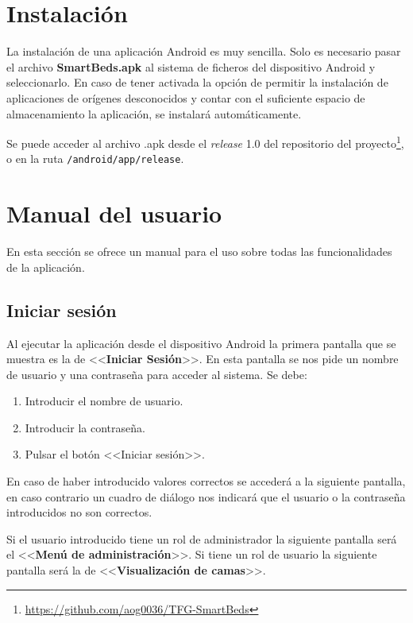 \section{Instalación}

La instalación de una aplicación Android es muy sencilla. Solo es necesario pasar el archivo \textbf{SmartBeds.apk} al sistema de ficheros del dispositivo Android y seleccionarlo. En caso de tener activada la opción de permitir la instalación de aplicaciones de orígenes desconocidos y contar con el suficiente espacio de almacenamiento la aplicación, se instalará automáticamente. 

Se puede acceder al archivo .apk desde el \textit{release} 1.0 del repositorio del proyecto\footnote{\url{https://github.com/aog0036/TFG-SmartBeds}}, o en la ruta \texttt{/android/app/release}.

\section{Manual del usuario}

En esta sección se ofrece un manual para el uso sobre todas las funcionalidades de la aplicación. 

\subsection{Iniciar sesión}

Al ejecutar la aplicación desde el dispositivo Android la primera pantalla que se muestra es la de <<\textbf{Iniciar Sesión}>>. En esta pantalla se nos pide un nombre de usuario y una contraseña para acceder al sistema. Se debe: 

\begin{enumerate}
	\item Introducir el nombre de usuario. 
	\item Introducir la contraseña. 
	\item Pulsar el botón <<Iniciar sesión>>. 
\end{enumerate}

En caso de haber introducido valores correctos se accederá a la siguiente pantalla, en caso contrario un cuadro de diálogo nos indicará que el usuario o la contraseña introducidos no son correctos. 

Si el usuario introducido tiene un rol de administrador la siguiente pantalla será el <<\textbf{Menú de administración}>>. Si tiene un rol de usuario la siguiente pantalla será la de <<\textbf{Visualización de camas}>>. 

